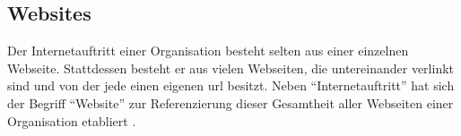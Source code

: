         \subsection{Websites}
            Der Internetauftritt einer Organisation besteht selten aus einer
            einzelnen Webseite.
            Stattdessen besteht er aus vielen Webseiten,
            die untereinander verlinkt sind und von der jede einen eigenen
            \gls{url} besitzt.
            Neben "`Internetauftritt"' hat sich der Begriff "`Website"' zur
            Referenzierung dieser Gesamtheit aller Webseiten einer Organisation
            etabliert \cite{duden:Internetauftritt, oxford:Website}.